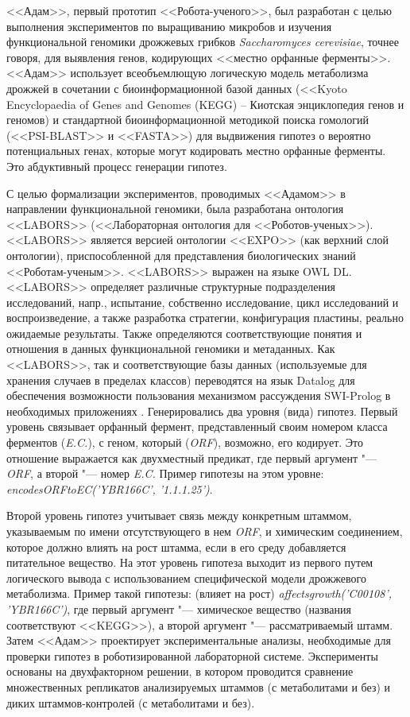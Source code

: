 <<Адам>>, первый прототип <<Робота-ученого>>, был разработан с целью выполнения экспериментов по выращиванию микробов 
и изучения функциональной геномики дрожжевых грибков \textit{Saccharomyces cerevisiae}, точнее говоря, для выявления 
генов, кодирующих <<местно орфанные ферменты>>. <<Адам>> использует всеобъемлющую логическую модель метаболизма дрожжей в 
сочетании с биоинформационной базой данных (<<Kyoto Encyclopaedia of Genes and Genomes (KEGG) – Киотская энциклопедия 
генов и геномов) и стандартной биоинформационной методикой поиска гомологий (<<PSI-BLAST>> и <<FASTA>>) для выдвижения 
гипотез о вероятно потенциальных генах, которые могут кодировать местно орфанные ферменты. Это абдуктивный процесс 
генерации гипотез.

С целью формализации экспериментов, проводимых <<Адамом>> в направлении функциональной геномики, была разработана 
онтология <<LABORS>> (<<Лабораторная онтология для <<Роботов-ученых>>). <<LABORS>> является версией онтологии <<EXPO>> (как 
верхний слой онтологии), приспособленной для представления биологических знаний <<Роботам-ученым>>. <<LABORS>> выражен 
на языке OWL DL. <<LABORS>> определяет различные структурные подразделения исследований, напр., испытание, собственно 
исследование, цикл исследований и воспроизведение, а также разработка стратегии, конфигурация пластины, реально 
ожидаемые результаты. Также определяются соответствующие понятия и отношения в данных функциональной геномики и 
метаданных. Как <<LABORS>>, так и соответствующие базы данных (используемые для хранения случаев в пределах классов) 
переводятся на язык Datalog для обеспечения возможности пользования механизмом рассуждения SWI-Prolog в необходимых 
приложениях \cite{king2004functional}
.
Генерировались два уровня (вида) гипотез. Первый уровень связывает орфанный фермент, представленный своим номером 
класса ферментов (\textit{E.C.}), с геном, который (\textit{ORF}), возможно, его кодирует. Это отношение выражается 
как двухместный предикат, где первый аргумент "--- \textit{ORF}, а второй "--- номер \textit{E.C.} Пример гипотезы 
на этом уровне: \textit{encodesORFtoEC('YBR166C', '1.1.1.25')}.

Второй уровень гипотез учитывает связь между конкретным штаммом, указываемым по имени отсутствующего в нем \textit{ORF}, 
и химическим соединением, которое должно влиять на рост штамма, если в его среду добавляется питательное вещество. На 
этот уровень гипотеза выходит из первого путем логического вывода с использованием специфической модели дрожжевого 
метаболизма. Пример такой гипотезы: (влияет на рост) \textit{affects\textunderscore growth('C00108', 'YBR166C')}, где 
первый аргумент "--- химическое вещество (названия соответствуют <<KEGG>>), а второй аргумент "--- рассматриваемый штамм. 
Затем <<Адам>> проектирует экспериментальные анализы, необходимые для проверки гипотез в роботизированной лабораторной 
системе. Эксперименты основаны на двухфакторном решении, в котором проводится сравнение множественных репликатов 
анализируемых штаммов (с метаболитами и без) и диких штаммов-контролей (с метаболитами и без).


